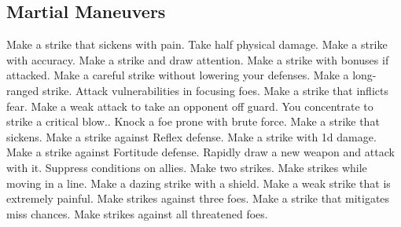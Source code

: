 \subsection{Martial Maneuvers}\label{Martial Maneuvers}
\begin{spelllist}
 Make a strike that sickens with pain.
 Take half physical damage.
 Make a strike with  accuracy.
 Make a strike and draw attention.
 Make a strike with bonuses if attacked.
 Make a careful strike without lowering your defenses.
 Make a long-ranged strike.
 Attack vulnerabilities in focusing foes.
 Make a strike that inflicts fear.
 Make a weak attack to take an opponent off guard.
 You concentrate to strike a critical blow..
 Knock a foe prone with brute force.
 Make a strike that sickens.
 Make a strike against Reflex defense.
 Make a strike with \plus1d damage.
 Make a strike against Fortitude defense.
 Rapidly draw a new weapon and attack with it.
 Suppress conditions on allies.
 Make two strikes.
 Make strikes while moving in a line.
 Make a dazing strike with a shield.
 Make a weak strike that is extremely painful.
 Make strikes against three foes.
 Make a strike that mitigates miss chances.
 Make strikes against all threatened foes.
\end{spelllist}



\small
